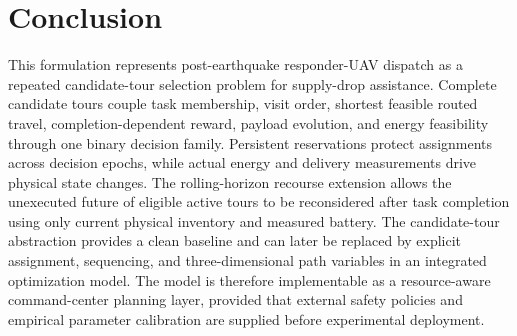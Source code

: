 \documentclass[conference]{IEEEtran}
\begin{document}
\section{Conclusion}
This formulation represents post-earthquake responder-UAV dispatch as a repeated candidate-tour selection problem for supply-drop assistance. Complete candidate tours couple task membership, visit order, shortest feasible routed travel, completion-dependent reward, payload evolution, and energy feasibility through one binary decision family. Persistent reservations protect assignments across decision epochs, while actual energy and delivery measurements drive physical state changes. The rolling-horizon recourse extension allows the unexecuted future of eligible active tours to be reconsidered after task completion using only current physical inventory and measured battery. The candidate-tour abstraction provides a clean baseline and can later be replaced by explicit assignment, sequencing, and three-dimensional path variables in an integrated optimization model. The model is therefore implementable as a resource-aware command-center planning layer, provided that external safety policies and empirical parameter calibration are supplied before experimental deployment.
\end{document}

